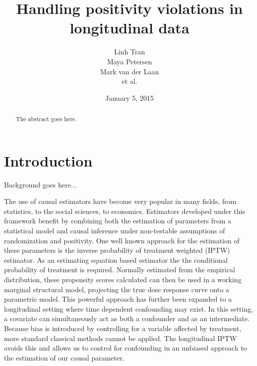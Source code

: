 \documentclass{article}\usepackage[]{graphicx}\usepackage[]{color}
\title{Handling positivity violations in longitudinal data}
\author{Linh Tran \\
		Maya Petersen \\
        Mark van der Laan \\
		et al.}
\date{January 5, 2015}
\renewcommand{\indent}{\hskip 20pt}
\begin{document}
\maketitle




\begin{abstract}

The abstract goes here.

\end{abstract}


\section{Introduction}

\indent Background goes here...
\newline

\indent The use of causal estimators have become very popular in many fields,
from statistics, to the social sciences, to economics. Estimators developed
under this framework benefit by combining both the estimation of parameters from
a statistical model and causal inference under non-testable assumptions of randomization and
positivity. One well known approach for the estimation of these
parameters is the inverse probability of treatment weighted (IPTW) estimator. As
an estimating equation based estimator the the conditional probability of
treatment is required. Normally estimated from the empirical distribution,
these propensity scores calculated can then be used in a working marginal
structural model, projecting the true dose response curve onto a parametric
model. This powerful approach has further been expanded to a longitudinal
setting where time dependent confounding may exist. In this setting, a covariate
can simultaneously act as both a confounder and as an intermediate. Because bias
is introduced by controlling for a variable affected by treatment, more standard
classical methods cannot be applied. The longitudinal IPTW avoids this and
allows us to control for confounding in an unbiased approach to the estimation
of our causal parameter.
\newline
\end{document}
